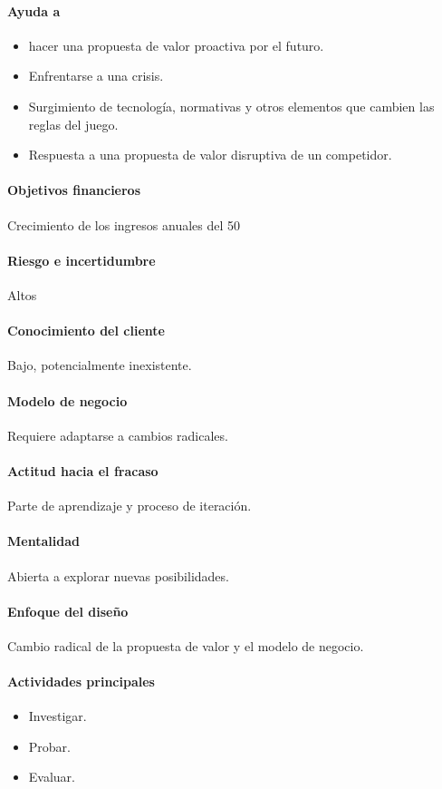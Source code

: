 \documentclass[11pt]{book}
\begin{document}
\paragraph{Ayuda a}
\begin{itemize}
\item hacer una propuesta de valor proactiva por el futuro.
\item Enfrentarse a una crisis.
\item Surgimiento de tecnología, normativas y otros elementos que cambien las reglas del juego.
\item Respuesta a una propuesta de valor disruptiva de un competidor.
\end{itemize}
\paragraph{Objetivos financieros}
Crecimiento de los ingresos anuales del 50 %
\paragraph{Riesgo e incertidumbre}
Altos
\paragraph{Conocimiento del cliente}
Bajo, potencialmente inexistente.
\paragraph{Modelo de negocio}
Requiere adaptarse a cambios radicales.
\paragraph{Actitud hacia el fracaso}
Parte de aprendizaje y proceso de iteración.
\paragraph{Mentalidad}
Abierta a explorar nuevas posibilidades.
\paragraph{Enfoque del diseño}
Cambio radical de la propuesta de valor y el modelo de negocio.
\paragraph{Actividades principales}
\begin{itemize}
\item Investigar.
\item Probar.
\item Evaluar.
\end{itemize}
\end{document}
